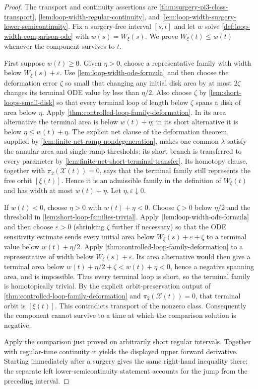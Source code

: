 \begin{proof}
The transport and continuity assertions are
\ref{thm:surgery-pi3-class-transport},
\ref{lem:loop-width-regular-continuity}, and
\ref{lem:loop-width-surgery-lower-semicontinuity}.  Fix a surgery-free
interval $[s,t]$ and let $w$ solve
\ref{def:loop-width-comparison-ode} with $w(s)=W_\xi(s)$.  We prove
$W_\xi(t)\le w(t)$ whenever the component survives to $t$.

First suppose $w(t)\ge0$.  Given $\eta>0$, choose a representative family
with width below $W_\xi(s)+\varepsilon$.  Use
\ref{lem:loop-width-ode-formula} and then choose the deformation error
$\zeta$ so small that changing any initial disk area by at most
$2\zeta$ changes its terminal ODE value by less than $\eta/2$.  Also choose
$\zeta$ by \ref{lem:short-loops-small-disk} so that every terminal loop of
length below $\zeta$ spans a disk of area below $\eta$.  Apply
\ref{thm:controlled-loop-family-deformation}.  In its area alternative the
terminal area is below $w(t)+\eta$; in its short alternative it is below
$\eta\le w(t)+\eta$.  The explicit net clause of the deformation theorem,
supplied by \ref{lem:finite-net-ramp-nondegeneration}, makes one common
$\lambda$ satisfy the annular-area and single-ramp thresholds; its short
branch is transferred to every parameter by
\ref{lem:finite-net-short-terminal-transfer}.  Its homotopy clause, together
with $\pi_2(\mathcal X(t))=0$, says that the terminal family still represents
the free orbit $[\xi(t)]$.  Hence it is an
admissible family in the definition of $W_\xi(t)$ and has width at most
$w(t)+\eta$.  Let $\eta,\varepsilon\downarrow0$.

If $w(t)<0$, choose $\eta>0$ with $w(t)+\eta<0$.  Choose
$\zeta>0$ below $\eta/2$ and the threshold in
\ref{lem:short-loop-families-trivial}.  Apply
$\ref{lem:loop-width-ode-formula}$ and then choose
$\varepsilon>0$ (shrinking $\zeta$ further if necessary) so that the ODE
sensitivity estimate sends every initial area below
$W_\xi(s)+\varepsilon+\zeta$ to a terminal value below
$w(t)+\eta/2$.  Apply
\ref{thm:controlled-loop-family-deformation} to a representative of width
below $W_\xi(s)+\varepsilon$.  Its area alternative would then give a
terminal area below $w(t)+\eta/2+\zeta<w(t)+\eta<0$, hence a negative
spanning area, and is impossible.  Thus every terminal loop is
short, so the terminal family is homotopically trivial.  By the explicit
orbit-preservation output of
\ref{thm:controlled-loop-family-deformation} and
$\pi_2(\mathcal X(t))=0$, that terminal orbit is $[\xi(t)]$.  This contradicts
transport of the nonzero class.  Consequently
the component cannot survive to a time at which the comparison solution is
negative.

Apply the comparison just proved on arbitrarily short regular intervals.
Together with regular-time continuity it yields the displayed upper forward
derivative.  Starting immediately after a surgery gives the same right-hand
inequality there; the separate left lower-semicontinuity statement accounts
for the jump from the preceding interval.
\end{proof}

